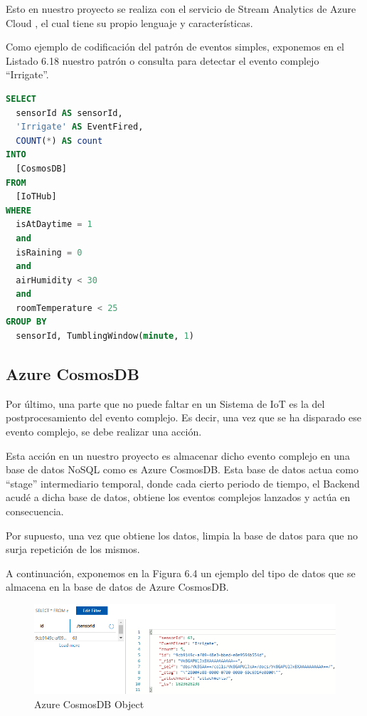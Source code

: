 Esto en nuestro proyecto se realiza con el servicio de Stream Analytics de Azure Cloud \cite{stream-analytics}, el cual tiene su propio lenguaje y características.

Como ejemplo de codificación del patrón de eventos simples, exponemos en el Listado 6.18 nuestro patrón o consulta para detectar el evento complejo ``Irrigate''.

\begin{lstlisting}[language=SQL,caption={ASASmartRural-Irrigate.asaql},captionpos=b]
SELECT
  sensorId AS sensorId,
  'Irrigate' AS EventFired,
  COUNT(*) AS count
INTO
  [CosmosDB]
FROM
  [IoTHub]
WHERE
  isAtDaytime = 1
  and
  isRaining = 0
  and
  airHumidity < 30
  and
  roomTemperature < 25
GROUP BY
  sensorId, TumblingWindow(minute, 1)
\end{lstlisting}

\subsection{Azure CosmosDB}
Por último, una parte que no puede faltar en un Sistema de IoT es la del postprocesamiento del evento complejo. Es decir, una vez que se ha disparado ese evento complejo, se debe realizar una acción.

Esta acción en un nuestro proyecto es almacenar dicho evento complejo en una base de datos NoSQL como es Azure CosmosDB. Esta base de datos actua como ``stage'' intermediario temporal, donde cada cierto periodo de tiempo, el Backend acudé a dicha base de datos, obtiene los eventos complejos lanzados y actúa en consecuencia.

Por supuesto, una vez que obtiene los datos, limpia la base de datos para que no surja repetición de los mismos.

A continuación, exponemos en la Figura 6.4 un ejemplo del tipo de datos que se almacena en la base de datos de Azure CosmosDB.

\begin{figure}[H]
    \centering
    \includegraphics[width=1\linewidth]{images/implementation/iot/iot cosmosdb object.png}
    \caption{Azure CosmosDB Object}
\end{figure}